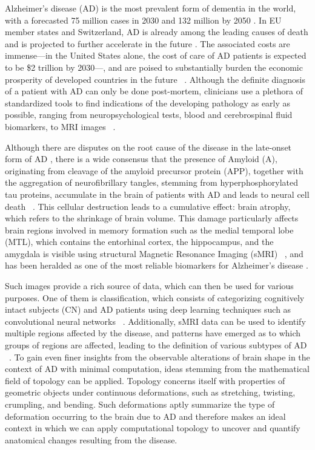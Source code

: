 \documentclass{article}
\begin{document}
Alzheimer's disease (AD) is the most prevalent form of dementia in the world, with a forecasted 75
million cases in 2030 and 132 million by 2050 \citep{world2017global}. In EU member states and
Switzerland, AD is already among the leading causes of death and is projected to further accelerate
in the future \citep{sleeman2019escalating}. The associated costs are immense---in the United
States alone, the cost of care of AD patients is expected to be \$2 trillion by 2030---, and are
poised to substantially burden the economic prosperity of developed countries in the future
~\citep{world2017global}. Although the definite diagnosis of a patient with AD can only be done
post-mortem, clinicians use a plethora of standardized tools to find indications of the developing
pathology as early as possible, ranging from neuropsychological tests, blood and cerebrospinal fluid
biomarkers, to MRI images ~\citep{mckhann2011diagnosis, smits2012early, lehmann2016biomarkers}.

Although there are disputes on the root cause of the disease in the late-onset form of AD
\citep{tharp2013origins, fulop2018can, hur2020innate}, there is a wide consensus that the presence
of Amyloid \textbeta{} (A\textbeta{}), originating from cleavage of the amyloid precursor protein
(APP), together with the aggregation of neurofibrillary tangles, stemming from hyperphosphorylated
tau proteins, accumulate in the brain of patients with AD and leads to neural cell death
~\citep{da2016insights}. This cellular destruction leads to a cumulative effect: brain atrophy,
which refers to the shrinkage of brain volume. This damage particularly affects brain regions
involved in memory formation such as the medial temporal lobe (MTL), which contains the entorhinal
cortex, the hippocampus, and the amygdala \citep{goedert2006century} is visible
using structural Magnetic Resonance Imaging (sMRI) ~\citep{frisoni2010clinical}, and has been
heralded as one of the most reliable biomarkers for Alzheimer's disease \citep{pini2016brain}.

Such images provide a rich source of data, which can then be used for various purposes. One of them
is classification, which consists of categorizing cognitively intact subjects (CN) and AD patients
using deep learning techniques such as convolutional neural networks ~\citep{wen2020convolutional}.
Additionally, sMRI data can be used to identify multiple regions affected by the disease, and
patterns have emerged as to which groups of regions are affected, leading to the definition of
various subtypes of AD ~\citep{poulakis2018heterogeneous,tijms2020pathophysiological}. To gain even
finer insights from the observable alterations of brain shape in the context of AD with minimal
computation, ideas stemming from the mathematical field of topology can be applied. Topology
concerns itself with properties of geometric objects under continuous deformations, such as
stretching, twisting, crumpling, and bending. Such deformations aptly summarize the type of
deformation occurring to the brain due to AD and therefore makes an ideal context in which we can
apply computational topology to uncover and quantify anatomical changes resulting from the disease.
\end{document}
